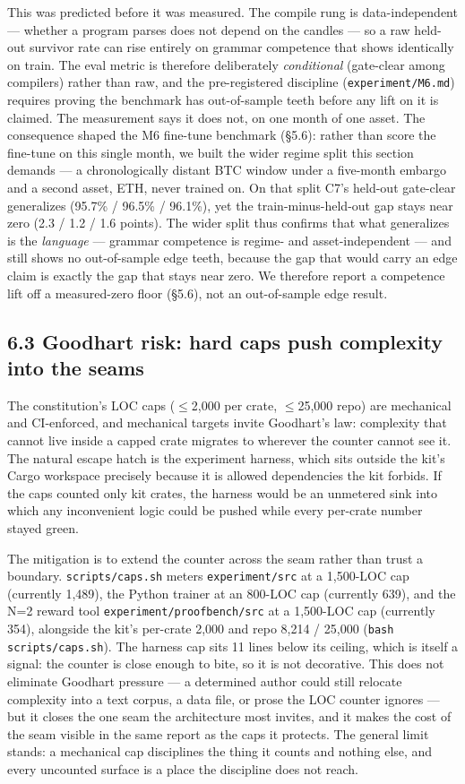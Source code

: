 \documentclass[11pt]{article}
\newcommand{\code}[1]{\texttt{#1}}
\begin{document}
This was predicted before it was measured. The compile rung is
data-independent --- whether a program parses does not depend on the candles --- so a
raw held-out survivor rate can rise entirely on grammar competence that shows
identically on train. The eval metric is therefore deliberately \emph{conditional}
(gate-clear among compilers) rather than raw, and the pre-registered discipline
(\code{experiment/M6.md}) requires proving the benchmark has out-of-sample teeth
before any lift on it is claimed. The measurement says it does not, on one month
of one asset. The consequence shaped the M6 fine-tune benchmark (\S{}5.6): rather
than score the fine-tune on this single month, we built the wider regime split
this section demands --- a chronologically distant BTC window under a five-month
embargo and a second asset, ETH, never trained on. On that split C7's held-out
gate-clear generalizes (95.7\% / 96.5\% / 96.1\%), yet the train-minus-held-out gap
stays near zero (2.3 / 1.2 / 1.6 points). The wider split thus confirms that
what generalizes is the \emph{language} --- grammar competence is regime- and
asset-independent --- and still shows no out-of-sample edge teeth, because the gap
that would carry an edge claim is exactly the gap that stays near zero. We
therefore report a competence lift off a measured-zero floor (\S{}5.6), not an
out-of-sample edge result.

\subsection*{6.3 Goodhart risk: hard caps push complexity into the seams}

The constitution's LOC caps ($\le$2,000 per crate, $\le$25,000 repo) are mechanical and
CI-enforced, and mechanical targets invite Goodhart's law: complexity that
cannot live inside a capped crate migrates to wherever the counter cannot see
it. The natural escape hatch is the experiment harness, which sits outside the
kit's Cargo workspace precisely because it is allowed dependencies the kit
forbids. If the caps counted only kit crates, the harness would be an unmetered
sink into which any inconvenient logic could be pushed while every per-crate
number stayed green.

The mitigation is to extend the counter across the seam rather than trust a
boundary. \code{scripts/caps.sh} meters \code{experiment/src} at a 1,500-LOC cap
(currently 1,489), the Python trainer at an 800-LOC cap (currently 639), and the
N=2 reward tool \code{experiment/proofbench/src} at a 1,500-LOC cap (currently 354),
alongside the kit's per-crate 2,000 and repo 8,214 / 25,000
(\code{bash scripts/caps.sh}). The harness cap sits 11 lines below its ceiling, which
is itself a signal: the counter is close enough to bite, so it is not
decorative. This does not eliminate Goodhart pressure --- a determined author could
still relocate complexity into a text corpus, a data file, or prose the LOC
counter ignores --- but it closes the one seam the architecture most invites, and
it makes the cost of the seam visible in the same report as the caps it
protects. The general limit stands: a mechanical cap disciplines the thing it
counts and nothing else, and every uncounted surface is a place the discipline
does not reach.
\end{document}

